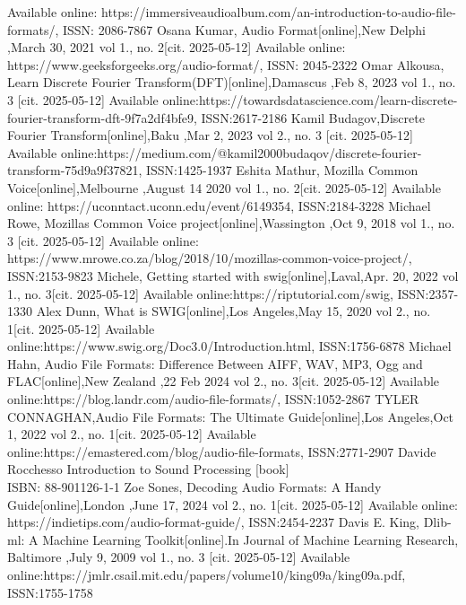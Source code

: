 \documentclass[english,12pt,oneside,a4paper]{article}
\begin{document}
\begin{thebibliography}{15}
		Available online: 
		https://immersiveaudioalbum.com/an-introduction-to-audio-file-formats/, ISSN: 2086-7867
		Osana Kumar, Audio Format[online],New Delphi ,March 30, 2021 vol 1., no. 2[cit. 2025-05-12]
		Available online:
		https://www.geeksforgeeks.org/audio-format/, ISSN: 2045-2322
		Omar Alkousa, Learn Discrete Fourier Transform(DFT)[online],Damascus ,Feb 8, 2023 vol 1., no. 3 [cit. 2025-05-12]
		Available online:https://towardsdatascience.com/learn-discrete-fourier-transform-dft-9f7a2df4bfe9, ISSN:2617-2186
		Kamil Budagov,Discrete Fourier Transform[online],Baku ,Mar 2, 2023 vol 2., no. 3 [cit. 2025-05-12]
		Available online:https://medium.com/@kamil2000budaqov/discrete-fourier-transform-75d9a9f37821, ISSN:1425-1937
		Eshita Mathur, Mozilla Common Voice[online],Melbourne ,August 14 2020 vol 1., no. 2[cit. 2025-05-12]
		Available online: https://uconntact.uconn.edu/event/6149354, ISSN:2184-3228
		Michael Rowe, Mozillas Common Voice project[online],Wassington ,Oct 9, 2018 vol 1., no. 3 [cit. 2025-05-12]
		Available online: https://www.mrowe.co.za/blog/2018/10/mozillas-common-voice-project/, ISSN:2153-9823
		Michele, Getting started with swig[online],Laval,Apr. 20, 2022 vol 1., no. 3[cit. 2025-05-12]
		Available online:https://riptutorial.com/swig, ISSN:2357-1330
		Alex Dunn, What is SWIG[online],Los Angeles,May 15, 2020 vol 2., no. 1[cit. 2025-05-12]
		Available online:https://www.swig.org/Doc3.0/Introduction.html, ISSN:1756-6878
		Michael Hahn, Audio File Formats: Difference Between AIFF, WAV, MP3, Ogg and FLAC[online],New Zealand ,22 Feb 2024 vol 2., no. 3[cit. 2025-05-12] Available online:https://blog.landr.com/audio-file-formats/, ISSN:1052-2867
		TYLER CONNAGHAN,Audio File Formats: The Ultimate Guide[online],Los Angeles,Oct 1, 2022 vol 2., no. 1[cit. 2025-05-12] Available online:https://emastered.com/blog/audio-file-formats, ISSN:2771-2907
		Davide Rocchesso Introduction to Sound Processing [book]\\ ISBN: 88-901126-1-1
		Zoe Sones, Decoding Audio Formats: A Handy Guide[online],London ,June 17, 2024 vol 2., no. 1[cit. 2025-05-12] Available online: https://indietips.com/audio-format-guide/, ISSN:2454-2237
		Davis E. King, Dlib-ml: A Machine Learning Toolkit[online].In Journal of Machine Learning Research, Baltimore ,July 9, 2009 vol 1., no. 3 [cit. 2025-05-12]
		 Available online:https://jmlr.csail.mit.edu/papers/volume10/king09a/king09a.pdf, ISSN:1755-1758

\end{thebibliography}
\end{document}
